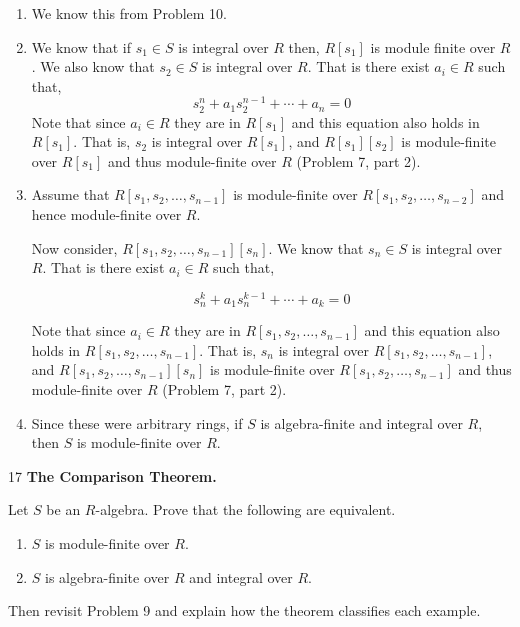 \documentclass[Notebook.tex]{subfiles}
\begin{document}
\begin{solution}
    \bbni
    \begin{enumerate}
        \item We know this from Problem 10. 
        \item We know that if $s_1 \in S$ is integral over $R$ then, $R[s_1]$ is module finite over $R$. We also know that $s_2 \in S$ is integral over $R$. That is there exist $a_i \in R$ such that, 
        \[s_2^n + a_1s_2^{n-1} + \cdots + a_n = 0\]
        Note that since $a_i \in R$ they are in $R[s_1]$ and this equation also holds in $R[s_1]$. That is, $s_2$ is integral over $R[s_1]$, and $R[s_1][s_2]$ is module-finite over $R[s_1]$ and thus module-finite over $R$ (Problem 7, part 2). 
        \item Assume that $R[s_1, s_2, \ldots, s_{n-1}]$ is module-finite over $R[s_1, s_2, \ldots, s_{n-2}]$ and hence module-finite over $R$. 
        
        Now consider, $R[s_1, s_2, \ldots, s_{n-1}][s_n]$.  We know that $s_n \in S$ is integral over $R$. That is there exist $a_i \in R$ such that, 

        \[s_n^k + a_1s_n^{k-1} + \cdots + a_k = 0\]

        Note that since $a_i \in R$ they are in $R[s_1, s_2, \ldots, s_{n-1}]$ and this equation also holds in $R[s_1, s_2, \ldots, s_{n-1}]$. That is, $s_n$ is integral over $R[s_1, s_2, \ldots, s_{n-1}]$, and $R[s_1, s_2, \ldots, s_{n-1}][s_n]$ is module-finite over $R[s_1, s_2, \ldots, s_{n-1}]$ and thus module-finite over $R$ (Problem 7, part 2). 



        \item Since these were arbitrary rings, if $S$ is algebra-finite and integral over $R$, then $S$ is module-finite over $R$. 
    \end{enumerate}
\end{solution}


\newpage 

\begin{problem}{17}
    \textbf{The Comparison Theorem.} 
    
    Let $S$ be an $R$-algebra. Prove that the following are equivalent.
    \begin{enumerate}
        \item $S$ is module-finite over $R$.
        \item $S$ is algebra-finite over $R$ and integral over $R$.
    \end{enumerate}
    Then revisit Problem 9 and explain how the theorem classifies each example.
\end{problem}
\end{document}
